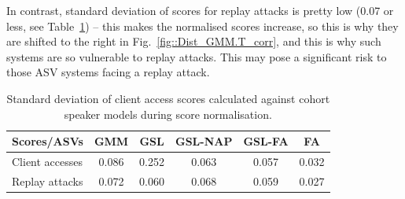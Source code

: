 In contrast, standard deviation of scores for replay attacks is pretty low (0.07 or less, see Table~\ref{tab::scores_cohort}) -- this makes the normalised scores increase, so this is why they are shifted to the right in Fig.~\ref{fig::Dist_GMM.T_corr}, and this is why such systems are so vulnerable to replay attacks. This may pose a significant risk to those ASV systems facing a replay attack.

\begin{table}
\begin{center}
    \begin{tabular}{ l || c c c c c }
    \hline
     	 Scores/ASVs & GMM & GSL & GSL-NAP & GSL-FA & FA\\ 

 \hline \hline
Client accesses & 0.086 & 0.252 & 0.063 & 0.057 & 0.032\\
Replay attacks & 0.072 & 0.060 & 0.068 & 0.059 & 0.027\\
\hline
    \end{tabular}
    \caption{Standard deviation of client access scores calculated against cohort speaker models during score normalisation.}
		\label{tab::scores_cohort}
   \end{center}
\end{table}


%
%
%


